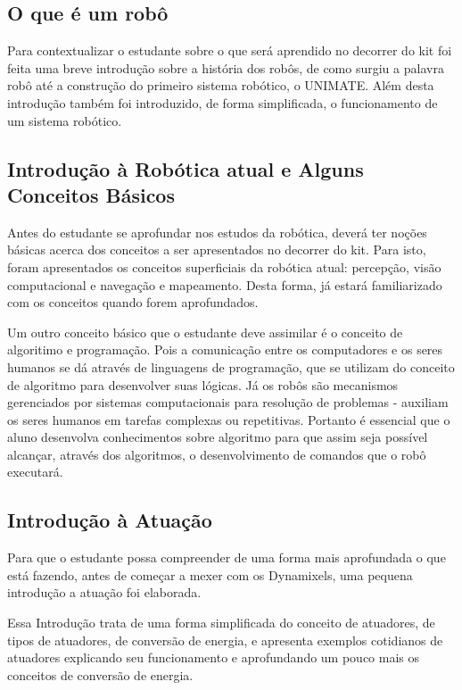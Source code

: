 \subsection{O que é um robô}
Para contextualizar o estudante sobre o que será aprendido no decorrer do kit foi feita uma breve introdução sobre a história dos robôs, de como surgiu a palavra robô até a construção do primeiro sistema robótico, o UNIMATE. Além desta introdução também foi introduzido, de forma simplificada, o funcionamento de um sistema robótico.

\subsection{Introdução à Robótica atual e Alguns Conceitos Básicos}
Antes do estudante se aprofundar nos estudos da robótica, deverá ter noções básicas acerca dos conceitos a ser apresentados no decorrer do kit. Para isto, foram apresentados os conceitos superficiais da robótica atual: percepção, visão computacional e navegação e mapeamento. Desta forma, já estará familiarizado com os conceitos quando forem aprofundados. 

Um outro conceito básico que o estudante deve assimilar é o conceito de algoritimo e programação. Pois a comunicação entre os computadores e os seres humanos se dá através de linguagens de programação, que se utilizam do conceito de algoritmo para desenvolver suas lógicas. Já os robôs são mecanismos gerenciados por sistemas computacionais para resolução de problemas - auxiliam os seres humanos em tarefas complexas ou repetitivas. Portanto é essencial que o aluno desenvolva conhecimentos sobre algoritmo para que assim seja possível alcançar, através dos algoritmos, o desenvolvimento de comandos que o robô executará.

\subsection{Introdução à Atuação}
Para que o estudante possa compreender de uma forma mais aprofundada o que está fazendo, antes de começar a mexer com os Dynamixels, uma pequena introdução a atuação foi elaborada.

Essa Introdução trata de uma forma simplificada do conceito de atuadores, de tipos de atuadores, de conversão de energia, e apresenta exemplos cotidianos de atuadores explicando seu funcionamento e aprofundando um pouco mais os conceitos de conversão de energia. \cite{tutAtua}

